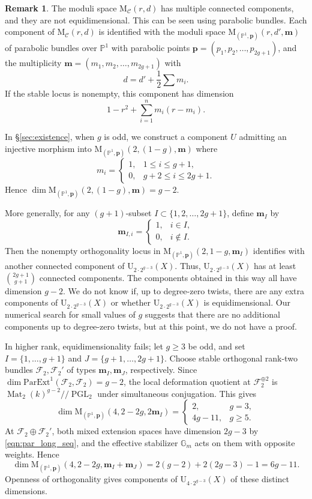 \documentclass[12pt, letterpaper]{amsart}
\theoremstyle{definition}
\newtheorem{remark}[theorem]{Remark}
\newcommand{\PP}{\mathbb{P} }
\newcommand{\cC}{\mathcal{C} }
\newcommand{\cF}{\mathcal{F} }
\newcommand{\bp}{\mathbf{p} }
\newcommand{\bm}{\mathbf{m} }
\newcommand{\rM}{\mathrm{M} }
\newcommand{\rU}{\mathrm{U} }
\def\pExt{\mathrm{ParExt} }
\def\git{/\!/ }
\begin{document}
\begin{remark}\label{rmk:dimension}
The moduli space \(\rM_{\cC}(r, d)\) has multiple connected components, and they are not equidimensional. This can be seen using parabolic bundles. Each component of \(\rM_{\cC}(r, d)\) is identified with the moduli space \(\rM_{(\PP^1, \bp)}(r, d', \bm)\) of parabolic bundles over \(\PP^1\) with parabolic points \(\bp = (p_1, p_2, \dots, p_{2g+1})\), and the multiplicity \(\bm = (m_1, m_2, \dots, m_{2g+1})\) with
\[d = d' + \frac{1}{2}\sum m_i.\]
If the stable locus is nonempty, this component has dimension
\[
1 - r^2 + \sum_{i=1}^n m_i (r-m_i).
\]

In \S\ref{sec:existence}, when \(g\) is odd, we construct a component \(U\) admitting an injective morphism into \(\rM_{(\PP^1, \bp)}(2, (1-g), \bm)\) where
\[m_i = \begin{cases} 1, & 1 \le i \le g+1,\\ 0, & g+2 \le i \le 2g+1. \end{cases}\]
Hence \(\dim \rM_{(\PP^1, \bp)}(2, (1-g), \bm) = g - 2\).

More generally, for any \((g+1)\)-subset \(I \subset \{1, 2, \dots, 2g+1\}\), define \(\bm_I\) by
\[\bm_{I,i} = \begin{cases} 1, & i \in I,\\ 0, & i \notin I. \end{cases}\]
Then the nonempty orthogonality locus in \(\rM_{(\PP^1, \bp)}(2, 1-g, \bm_I)\) identifies with another connected component of \(\rU_{2\cdot 2^{g-3}}(X)\). Thus, \(\rU_{2\cdot 2^{g-3}}(X)\) has at least \(\binom{2g+1}{g+1}\) connected components. The components obtained in this way all have dimension \(g-2\). We do not know if, up to degree-zero twists, there are any extra components of \(\rU_{2\cdot 2^{g-3}}(X)\) or whether \(\rU_{2\cdot 2^{g-3}}(X)\) is equidimensional. Our numerical search for small values of \(g\) suggests that there are no additional components up to degree-zero twists, but at this point, we do not have a proof.

In higher rank, equidimensionality fails; let \(g\ge3\) be odd, and set \(I=\{1,\dots,g+1\}\) and \(J=\{g+1,\dots,2g+1\}\). Choose stable orthogonal rank-two bundles \(\cF_2,\cF_2'\) of types \(\bm_I,\bm_J\), respectively. Since \(\dim\pExt^1(\cF_2,\cF_2)=g-2\), the local deformation quotient at \(\cF_2^{\oplus2}\) is \(\operatorname{Mat}_2(k)^{g-2}\git\operatorname{PGL}_2\) under simultaneous conjugation. This gives
\[\dim\rM_{(\PP^1,\bp)}(4,2-2g,2\bm_I)=\begin{cases} 2,&g=3,\\4g-11,&g\ge5. \end{cases}\]
At \(\cF_2\oplus\cF_2'\), both mixed extension spaces have dimension \(2g-3\) by \eqref{eqn:par_long_seq}, and the effective stabilizer \(\mathbb G_m\) acts on them with opposite weights. Hence
\[\dim\rM_{(\PP^1,\bp)}(4,2-2g,\bm_I+\bm_J)=2(g-2)+2(2g-3)-1=6g-11.\]
Openness of orthogonality gives components of \(\rU_{4\cdot2^{g-3}}(X)\) of these distinct dimensions.
\end{remark}
\end{document}

